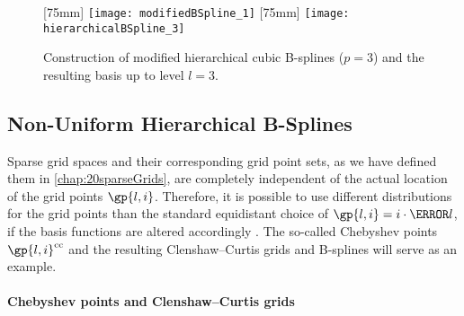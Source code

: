 \begin{figure}
  [75mm]{%
    \texttt{[image: modifiedBSpline\_1]}%
  }%
  \hfill%
  [75mm]{%
    \texttt{[image: hierarchicalBSpline\_3]}%
  }%
  \caption{%
    Construction of modified hierarchical cubic B-splines ($p = 3$) and
    the resulting basis up to level $l = 3$.%
  }
  \label{fig:modifiedBSpline}
\end{figure}



\subsection{Non-Uniform Hierarchical B-Splines}
\label{sec:314nonUniform}

Sparse grid spaces and their corresponding grid point sets,
as we have defined them in \cref{chap:20sparseGrids},
are completely independent of the actual location of the grid points
$\gp{l,i}$.
Therefore, it is possible to use different distributions for the grid points
than the standard equidistant choice of $\gp{l,i} = i \cdot \ms{l}$,
if the basis functions are altered accordingly
\cite{Valentin14Hierarchische}.
The so-called Chebyshev points $\gp{l,i}^\clenshawcurtis$ and the
resulting Clenshaw--Curtis grids and B-splines will serve as an example.

\paragraph{Chebyshev points and Clenshaw--Curtis grids}

